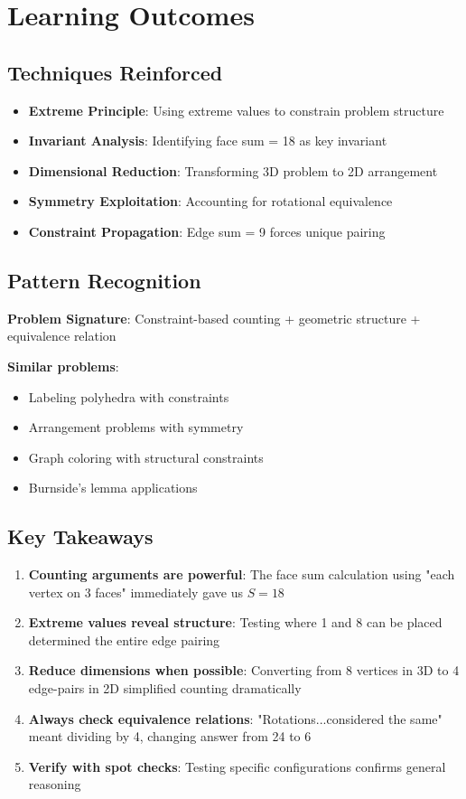 \documentclass[]{article}
\begin{document}
\section*{Learning Outcomes}
\subsection*{Techniques Reinforced}
\begin{itemize}[leftmargin=*]
    \item \textbf{Extreme Principle}: Using extreme values to constrain problem structure
    \item \textbf{Invariant Analysis}: Identifying face sum = 18 as key invariant
    \item \textbf{Dimensional Reduction}: Transforming 3D problem to 2D arrangement
    \item \textbf{Symmetry Exploitation}: Accounting for rotational equivalence
    \item \textbf{Constraint Propagation}: Edge sum = 9 forces unique pairing
\end{itemize}

\subsection*{Pattern Recognition}
\textbf{Problem Signature}: Constraint-based counting + geometric structure + equivalence relation

\textbf{Similar problems}:
\begin{itemize}[nosep]
    \item Labeling polyhedra with constraints
    \item Arrangement problems with symmetry
    \item Graph coloring with structural constraints
    \item Burnside's lemma applications
\end{itemize}

\subsection*{Key Takeaways}
\begin{enumerate}
    \item \textbf{Counting arguments are powerful}: The face sum calculation using "each vertex on 3 faces" immediately gave us $S = 18$
    
    \item \textbf{Extreme values reveal structure}: Testing where 1 and 8 can be placed determined the entire edge pairing
    
    \item \textbf{Reduce dimensions when possible}: Converting from 8 vertices in 3D to 4 edge-pairs in 2D simplified counting dramatically
    
    \item \textbf{Always check equivalence relations}: "Rotations...considered the same" meant dividing by 4, changing answer from 24 to 6
    
    \item \textbf{Verify with spot checks}: Testing specific configurations confirms general reasoning
\end{enumerate}
\end{document}
